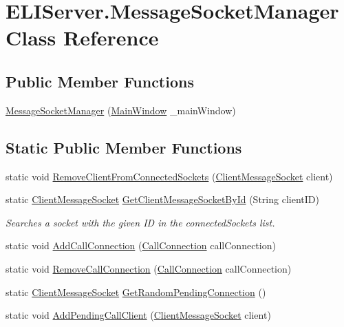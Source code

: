 \hypertarget{class_e_l_i_server_1_1_message_socket_manager}{}\section{E\+L\+I\+Server.\+Message\+Socket\+Manager Class Reference}
\label{class_e_l_i_server_1_1_message_socket_manager}
\subsection*{Public Member Functions}
\begin{DoxyCompactItemize}
\item 
\hyperlink{class_e_l_i_server_1_1_message_socket_manager_a28b6d0e215aa417970fc82b9239bebbb}{Message\+Socket\+Manager} (\hyperlink{class_e_l_i_server_1_1_main_window}{Main\+Window} \+\_\+main\+Window)
\end{DoxyCompactItemize}
\subsection*{Static Public Member Functions}
\begin{DoxyCompactItemize}
\item 
static void \hyperlink{class_e_l_i_server_1_1_message_socket_manager_a921b68b4622c90628ae7b179bccdb10c}{Remove\+Client\+From\+Connected\+Sockets} (\hyperlink{class_e_l_i_server_1_1_messaging_1_1_client_message_socket}{Client\+Message\+Socket} client)
\item 
static \hyperlink{class_e_l_i_server_1_1_messaging_1_1_client_message_socket}{Client\+Message\+Socket} \hyperlink{class_e_l_i_server_1_1_message_socket_manager_aa93a10042f33c7fe76d611346eb80ea0}{Get\+Client\+Message\+Socket\+By\+Id} (String client\+ID)
\begin{DoxyCompactList}\small\item\em Searches a socket with the given ID in the connected\+Sockets list. \end{DoxyCompactList}\item 
static void \hyperlink{class_e_l_i_server_1_1_message_socket_manager_acf805bfb3292019f77e637135009ee78}{Add\+Call\+Connection} (\hyperlink{class_e_l_i_server_1_1_call_connection}{Call\+Connection} call\+Connection)
\item 
static void \hyperlink{class_e_l_i_server_1_1_message_socket_manager_af591d88e97afd289dfd4f2d89713f5b2}{Remove\+Call\+Connection} (\hyperlink{class_e_l_i_server_1_1_call_connection}{Call\+Connection} call\+Connection)
\item 
static \hyperlink{class_e_l_i_server_1_1_messaging_1_1_client_message_socket}{Client\+Message\+Socket} \hyperlink{class_e_l_i_server_1_1_message_socket_manager_a6988d1ee0c08ded66a3d428f04585716}{Get\+Random\+Pending\+Connection} ()
\item 
static void \hyperlink{class_e_l_i_server_1_1_message_socket_manager_aeceb2994f44b015e0663d266b2ed11a6}{Add\+Pending\+Call\+Client} (\hyperlink{class_e_l_i_server_1_1_messaging_1_1_client_message_socket}{Client\+Message\+Socket} client)
\end{DoxyCompactItemize}
